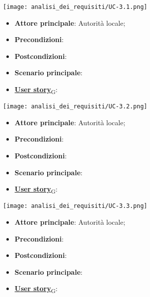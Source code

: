 \begin{center}
	\texttt{[image: analisi\_dei\_requisiti/UC-3.1.png]}
\end{center}
\begin{itemize}
	\item \textbf{Attore principale}: Autorità locale;
	\item \textbf{Precondizioni}:
	\item \textbf{Postcondizioni}:
	\item \textbf{Scenario principale}:
	\item \href{https://7last.github.io/docs/rtb/documentazione-interna/glossario\#user-story}{\textbf{User story}\textsubscript{G}}:
\end{itemize}

\begin{center}
	\texttt{[image: analisi\_dei\_requisiti/UC-3.2.png]}
\end{center}

\begin{itemize}
	\item \textbf{Attore principale}: Autorità locale;
	\item \textbf{Precondizioni}:
	\item \textbf{Postcondizioni}:
	\item \textbf{Scenario principale}:
	\item \href{https://7last.github.io/docs/rtb/documentazione-interna/glossario\#user-story}{\textbf{User story}\textsubscript{G}}:
\end{itemize}

\begin{center}
	\texttt{[image: analisi\_dei\_requisiti/UC-3.3.png]}
\end{center}

\begin{itemize}
	\item \textbf{Attore principale}: Autorità locale;
	\item \textbf{Precondizioni}:
	\item \textbf{Postcondizioni}:
	\item \textbf{Scenario principale}:
	\item \href{https://7last.github.io/docs/rtb/documentazione-interna/glossario\#user-story}{\textbf{User story}\textsubscript{G}}:
\end{itemize}

